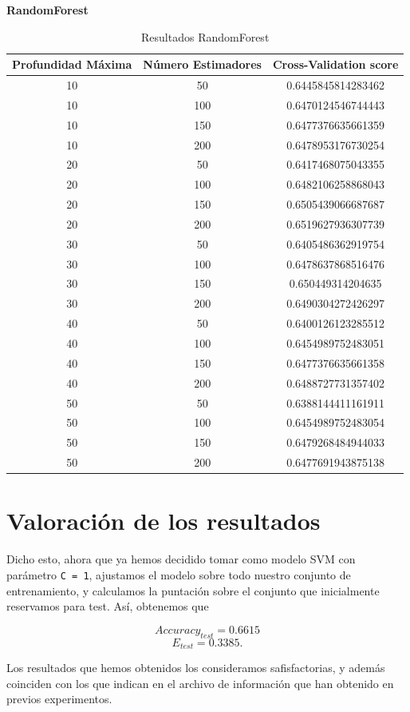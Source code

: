 \documentclass[size=a4, parskip=half, titlepage=false, toc=flat, toc=bib, 12pt]{scrartcl}
\begin{document}
\textbf{RandomForest}

\begin{table}[ht]
    \centering
    \caption{Resultados RandomForest}
    \label{tab:results-plapocket}
    \begin{tabular}{c | c | c  }
  Profundidad Máxima & Número Estimadores & Cross-Validation score \\
 \hline

10 & 50  & 0.6445845814283462 \\
10 & 100&  0.6470124546744443 \\
10 & 150&  0.6477376635661359 \\
10 & 200&  0.6478953176730254 \\
20 & 50&   0.6417468075043355 \\
20 & 100&  0.6482106258868043 \\
20 & 150&  0.6505439066687687 \\
20 & 200&  0.6519627936307739 \\
30 & 50&   0.6405486362919754 \\
30 & 100&  0.6478637868516476 \\
30 & 150&  0.650449314204635 \\
30 & 200&  0.6490304272426297 \\
40 & 50&   0.6400126123285512 \\
40 & 100&  0.6454989752483051 \\
40 & 150&  0.6477376635661358 \\
40 & 200&  0.6488727731357402 \\
50 & 50&   0.6388144411161911 \\
50 & 100&  0.6454989752483054 \\
50 & 150&  0.6479268484944033 \\
50 & 200&  0.6477691943875138
    \end{tabular}
\end{table}
\section{Valoración de los resultados}

Dicho esto, ahora que ya hemos decidido tomar como modelo SVM con parámetro \texttt{C = 1}, ajustamos el modelo sobre todo nuestro conjunto de entrenamiento, y calculamos la puntación sobre el conjunto que inicialmente reservamos para test. Así, obtenemos que

\[
Accuracy_{test} = 0.6615
\]
\[
E_{test} = 0.3385
.\]

Los resultados que hemos obtenidos los consideramos safisfactorias, y además coinciden con los que indican en el archivo de información que han obtenido en previos experimentos.

\end{document}
